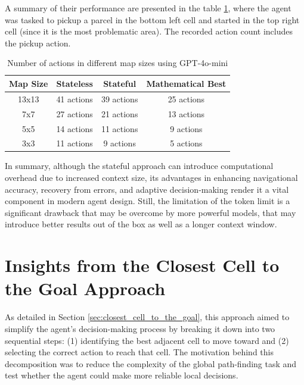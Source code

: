 A summary of their performance are presented in the table \ref{tab:svss}, where the
agent was tasked to pickup a parcel in the bottom left cell and started in the top
right cell (since it is the most problematic area). The recorded action count
includes the pickup action.

\vspace{5mm}
\begin{table}[h]
  \centering
  \begin{tabular}{c|cc|c}
    \textbf{Map Size} & \textbf{Stateless} & \textbf{Stateful} & \textbf{Mathematical Best} \\
    \hline
    13x13             & 41 actions         & 39 actions        & 25 actions                 \\
    7x7               & 27 actions         & 21 actions        & 13 actions                 \\
    5x5               & 14 actions         & 11 actions        & 9 actions                  \\
    3x3               & 11 actions         & 9 actions         & 5 actions                  \\
  \end{tabular}
  \caption{Number of actions in different map sizes using GPT-4o-mini}
  \label{tab:svss}
\end{table}
\vspace{5mm}

In summary, although the stateful approach can introduce computational overhead
due to increased context size, its advantages in enhancing navigational accuracy,
recovery from errors, and adaptive decision-making render it a vital component in
modern agent design. Still, the limitation of the token limit is a significant drawback
that may be overcome by more powerful models, that may introduce better results
out of the box as well as a longer context window.

\section{Insights from the Closest Cell to the Goal Approach}
\label{sec:closest_cell_to_the_goal_results}

As detailed in Section \ref{sec:closest_cell_to_the_goal}, this approach aimed
to simplify the agent's decision-making process by breaking it down into two
sequential steps: (1) identifying the best adjacent cell to move toward and (2) selecting
the correct action to reach that cell. The motivation behind this decomposition
was to reduce the complexity of the global path-finding task and test whether
the agent could make more reliable local decisions.

